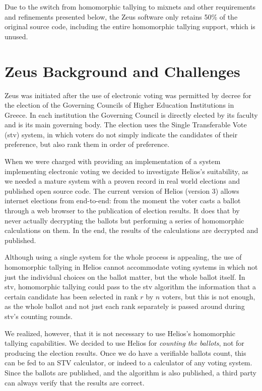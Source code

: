 \documentclass[letterpaper,10pt]{article}
\begin{document}
Due to the switch from homomorphic tallying to mixnets and other
requirements and refinements presented below, the Zeus software only
retains 50\% of the original source code, including the entire
homomorphic tallying support, which is unused.

\section{Zeus Background and Challenges}
\label{sec:challenges}

Zeus was initiated after the use of electronic voting was permitted by
decree for the election of the Governing Councils of Higher Education
Institutions in Greece. In each institution the Governing Council is
directly elected by its faculty and is its main governing body. The
election uses the Single Transferable Vote ({\sc stv}) system, in which
voters do not simply indicate the candidates of their preference, but
also rank them in order of preference. 

When we were charged with providing an implementation of a system
implementing electronic voting we decided to investigate Helios's
suitability, as we needed a mature system with a proven record in real
world elections and published open source code. The current version of
Helios (version 3) allows internet elections from end-to-end: from the
moment the voter casts a ballot through a web browser to the
publication of election results. It does that by never actually
decrypting the ballots but performing a series of homomorphic
calculations on them. In the end, the results of the calculations are
decrypted and published. 

Although using a single system for the whole process is appealing, the
use of homomorphic tallying in Helios cannot accommodate voting
systems in which not just the individual choices on the ballot matter,
but the whole ballot itself. In {\sc stv}, homomorphic tallying could pass
to the {\sc stv} algorithm the information that a certain candidate has been
selected in rank $r$ by $n$ voters, but this is not enough, as the whole
ballot and not just each rank separately is passed around during {\sc stv}'s
counting rounds.

We realized, however, that it is not necessary to use Helios's
homomorphic tallying capabilities. We decided to use Helios for
\emph{counting the ballots}, not for producing the election results.
Once we do have a verifiable ballots count, this can be fed to an STV
calculator, or indeed to a calculator of any voting system. Since the
ballots are published, and the algorithm is also published, a third
party can always verify that the results are correct.
\end{document}
